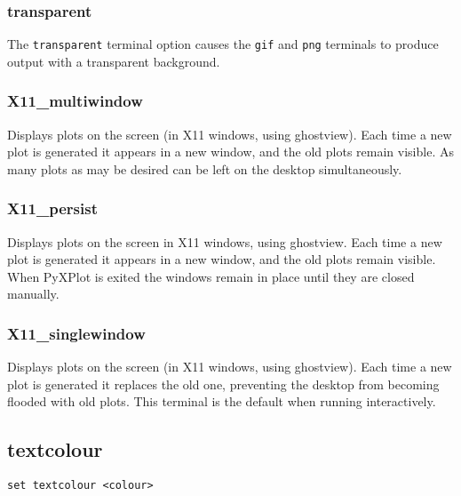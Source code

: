 \subsubsection{transparent}

The {\tt transparent} terminal option causes the {\tt gif} and {\tt png}
terminals to produce output with a transparent background.


\subsubsection{X11\_multiwindow}

Displays plots on the screen (in X11 windows, using ghostview). Each time a new
plot is generated it appears in a new window, and the old plots remain visible.
As many plots as may be desired can be left on the desktop simultaneously.

\subsubsection{X11\_persist}

Displays plots on the screen in X11 windows, using ghostview.  Each time a new
plot is generated it appears in a new window, and the old plots remain visible.
When PyXPlot is exited the windows remain in place until they are closed
manually.

\subsubsection{X11\_singlewindow}

Displays plots on the screen (in X11 windows, using ghostview). Each time a new
plot is generated it replaces the old one, preventing the desktop from becoming
flooded with old plots. This terminal is the default when running
interactively.

\subsection{textcolour}

\begin{verbatim}
set textcolour <colour>
\end{verbatim}

